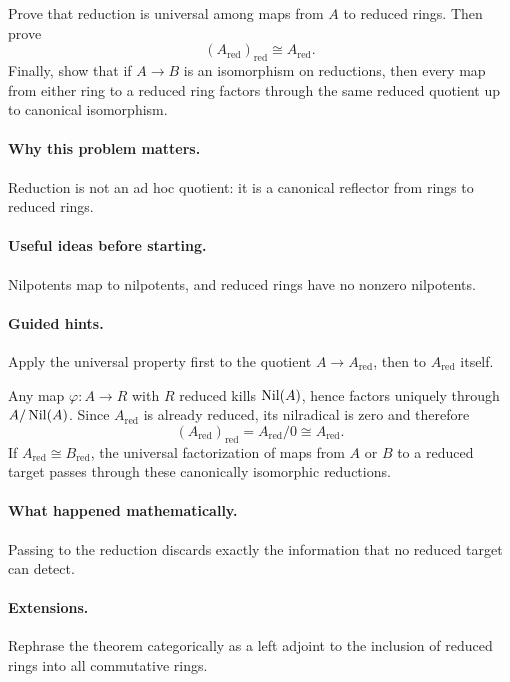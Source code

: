 \begin{problem}
Prove that reduction is universal among maps from $A$ to reduced rings.  Then prove
\[
(A_{\mathrm{red}})_{\mathrm{red}}\cong A_{\mathrm{red}}.
\]
Finally, show that if $A\to B$ is an isomorphism on reductions, then every map from either
ring to a reduced ring factors through the same reduced quotient up to canonical isomorphism.
\end{problem}
\paragraph{Why this problem matters.}
Reduction is not an ad hoc quotient: it is a canonical reflector from rings to reduced rings.
\paragraph{Useful ideas before starting.}
Nilpotents map to nilpotents, and reduced rings have no nonzero nilpotents.
\paragraph{Guided hints.}
Apply the universal property first to the quotient $A\to A_{\mathrm{red}}$, then to
$A_{\mathrm{red}}$ itself.
\begin{solution}
Any map $\varphi:A\to R$ with $R$ reduced kills $\operatorname{Nil}(A)$, hence factors uniquely through
$A/\operatorname{Nil}(A)$.  Since $A_{\mathrm{red}}$ is already reduced, its nilradical is zero and
therefore
\[
(A_{\mathrm{red}})_{\mathrm{red}}
=A_{\mathrm{red}}/0
\cong A_{\mathrm{red}}.
\]
If $A_{\mathrm{red}}\cong B_{\mathrm{red}}$, the universal factorization of maps from $A$
or $B$ to a reduced target passes through these canonically isomorphic reductions.
\end{solution}
\paragraph{What happened mathematically.}
Passing to the reduction discards exactly the information that no reduced target can detect.
\paragraph{Extensions.}
Rephrase the theorem categorically as a left adjoint to the inclusion of reduced rings into
all commutative rings.

